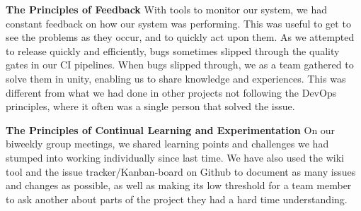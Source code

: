 \textbf{The Principles of Feedback}
With tools to monitor our system, we had constant feedback on how our system was performing. This was useful to get to see the problems as they occur, and to quickly act upon them. As we attempted to release quickly and efficiently, bugs sometimes slipped through the quality gates in our CI pipelines. When bugs slipped through, we as a team gathered to solve them in unity, enabling us to share knowledge and experiences. This was different from what we had done in other projects not following the DevOps principles, where it often was a single person that solved the issue.

\textbf{The Principles of Continual Learning and Experimentation}
On our biweekly group meetings, we shared learning points and challenges we had stumped into working individually since last time. We have also used the wiki tool and the issue tracker/Kanban-board on Github to document as many issues and changes as possible, as well as making its low threshold for a team member to ask another about parts of the project they had a hard time understanding.

